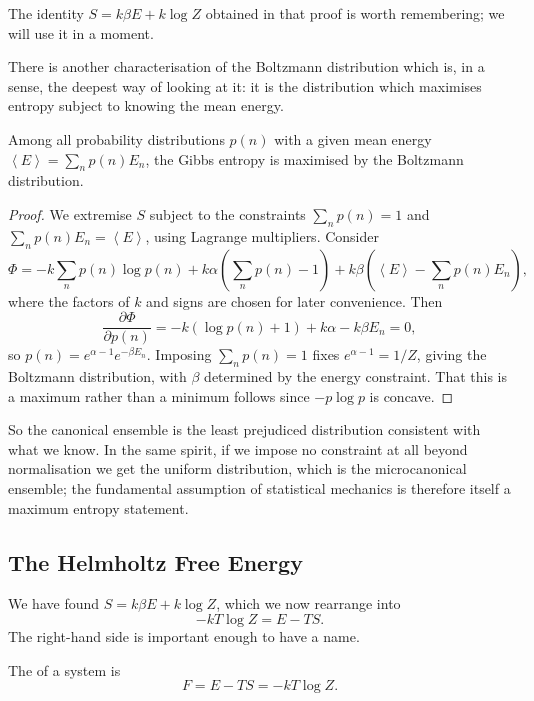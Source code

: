 \documentclass[a4paper]{scrartcl}
\newcommand{\avg}[1]{\left\langle #1 \right\rangle}
\begin{document}
The identity $S = k\beta E + k\log Z$ obtained in that proof is worth remembering; we will use it in a moment.

There is another characterisation of the Boltzmann distribution which is, in a sense, the deepest way of looking at it: it is the distribution which maximises entropy subject to knowing the mean energy.

\begin{proposition}
	Among all probability distributions $p(n)$ with a given mean energy $\avg E = \sum_n p(n) E_n$, the Gibbs entropy is maximised by the Boltzmann distribution.
\end{proposition}
\begin{proof}
	We extremise $S$ subject to the constraints $\sum_n p(n) = 1$ and $\sum_n p(n) E_n = \avg E$, using Lagrange multipliers. Consider
	$$
	\Phi = -k\sum_n p(n) \log p(n) + k\alpha\left(\sum_n p(n) - 1\right) + k\beta\left(\avg E - \sum_n p(n)E_n\right),
	$$
	where the factors of $k$ and signs are chosen for later convenience. Then
	$$
	\frac{\partial \Phi}{\partial p(n)} = -k\left(\log p(n) + 1\right) + k\alpha - k\beta E_n = 0,
	$$
	so $p(n) = e^{\alpha - 1}e^{-\beta E_n}$. Imposing $\sum_n p(n) = 1$ fixes $e^{\alpha - 1} = 1/Z$, giving the Boltzmann distribution, with $\beta$ determined by the energy constraint. That this is a maximum rather than a minimum follows since $-p\log p$ is concave.
\end{proof}

So the canonical ensemble is the least prejudiced distribution consistent with what we know. In the same spirit, if we impose no constraint at all beyond normalisation we get the uniform distribution, which is the microcanonical ensemble; the fundamental assumption of statistical mechanics is therefore itself a maximum entropy statement.

\subsection{The Helmholtz Free Energy}

We have found $S = k\beta E + k \log Z$, which we now rearrange into
$$
-kT\log Z = E - TS.
$$
The right-hand side is important enough to have a name.

\begin{definition}
	The  of a system is
	$$
	F = E - TS = -kT\log Z.
	$$
\end{definition}
\end{document}
